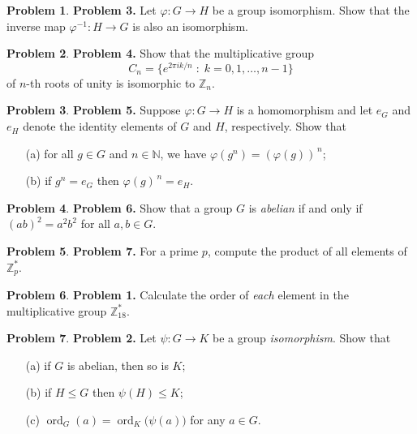 \documentclass[10pt]{article}
\theoremstyle{definition} %
\newtheorem{problem}{Problem}
\theoremstyle{plain} %
\begin{document}
  \bigskip
  \begin{problem}
  \textbf{Problem 3.}
  Let \(\varphi\colon G\to H\) be a group isomorphism.
  Show that the inverse map \(\varphi^{-1}\colon H\to G\) is also an
  isomorphism.
  \end{problem}
  
  \bigskip
  \begin{problem}
  \textbf{Problem 4.}
  Show that the multiplicative group
  \[
     C_{n}=\bigl\{e^{2\pi i k/n}\;:\;k=0,1,\dots,n-1\bigr\}
  \]
  of \(n\)-th roots of unity is isomorphic to \(\mathbb Z_{n}\).
  \end{problem}
  
  \bigskip
  \begin{problem}
  \textbf{Problem 5.}
  Suppose \(\varphi\colon G\to H\) is a homomorphism and let
  \(e_{G}\) and \(e_{H}\) denote the identity elements of \(G\) and \(H\),
  respectively.
  Show that
  \begin{enumerate}
    \item[(a)] for all \(g\in G\) and \(n\in\mathbb N\),
               we have \(\varphi(g^{n})=(\varphi(g))^{\,n}\);
    \item[(b)] if \(g^{n}=e_{G}\) then \(\varphi(g)^{\,n}=e_{H}\).
  \end{enumerate}
  \end{problem}
  
  \bigskip
  \begin{problem}
  \textbf{Problem 6.}
  Show that a group \(G\) is \emph{abelian} if and only if
  \((ab)^{2}=a^{2}b^{2}\) for all \(a,b\in G\).
  \end{problem}
  
  \bigskip
  \begin{problem}
  \textbf{Problem 7.}
  For a prime \(p\), compute the product of all elements of
  \(\mathbb Z_{p}^{\ast}\).
  \end{problem}
\begin{problem}
  \textbf{Problem 1.}
  Calculate the order of \emph{each} element in the multiplicative group
  \(\mathbb Z_{18}^{\ast}\).
  \end{problem}
  
  \bigskip
  \begin{problem}
  \textbf{Problem 2.}
  Let \(\psi\colon G\to K\) be a group \emph{isomorphism}.  Show that
  \begin{enumerate}
    \item[(a)] if \(G\) is abelian, then so is \(K\);
    \item[(b)] if \(H\le G\) then \(\psi(H)\le K\);
    \item[(c)] \(\operatorname{ord}_{G}(a)=\operatorname{ord}_{K}\!\bigl(\psi(a)\bigr)\)
               for any \(a\in G\).
  \end{enumerate}
  \end{problem}
  
\end{document}
